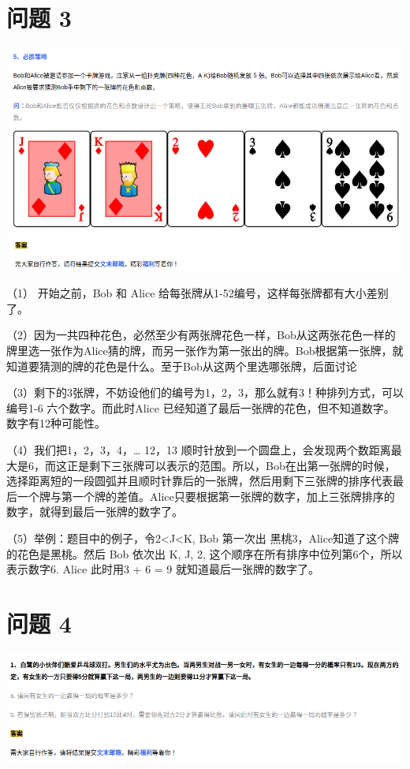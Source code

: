 \documentclass{article}
\begin{document}
\newpage
\section{问题 3}
\includegraphics[scale=0.5]{puke.png}

（1） 开始之前，Bob 和 Alice 给每张牌从1-52编号，这样每张牌都有大小差别了。

（2）因为一共四种花色，必然至少有两张牌花色一样，Bob从这两张花色一样的牌里选一张作为Alice猜的牌，而另一张作为第一张出的牌。Bob根据第一张牌，就知道要猜测的牌的花色是什么。至于Bob从这两个里选哪张牌，后面讨论

（3）剩下的3张牌，不妨设他们的编号为1，2，3，那么就有3！种排列方式，可以编号1-6 六个数字。而此时Alice 已经知道了最后一张牌的花色，但不知道数字。数字有12种可能性。

（4）我们把1，2，3，4，… 12，13 顺时针放到一个圆盘上，会发现两个数距离最大是6，而这正是剩下三张牌可以表示的范围。所以，Bob在出第一张牌的时候，选择距离短的一段圆弧并且顺时针靠后的一张牌，然后用剩下三张牌的排序代表最后一个牌与第一个牌的差值。Alice只要根据第一张牌的数字，加上三张牌排序的数字，就得到最后一张牌的数字了。

（5）举例：题目中的例子，令2<J<K, Bob 第一次出 黑桃3，Alice知道了这个牌的花色是黑桃。然后 Bob 依次出 K, J, 2, 这个顺序在所有排序中位列第6个，所以表示数字6. Alice 此时用3 + 6 = 9 就知道最后一张牌的数字了。



\newpage
\section{问题 4}
\includegraphics[scale=0.5]{pingpang.png}
\end{document}
